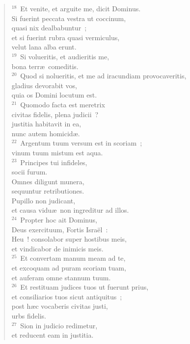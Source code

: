 \begin{verse}${}^{18}$~Et venite, et arguite me, dicit Dominus.\\ Si fuerint peccata vestra ut coccinum,\\ quasi nix dealbabuntur~;\\ et si fuerint rubra quasi vermiculus,\\ velut lana alba erunt.\\
${}^{19}$~Si volueritis, et audieritis me,\\ bona terr\ae\ comeditis.\\
${}^{20}$~Quod si nolueritis, et me ad iracundiam provocaveritis,\\ gladius devorabit vos,\\ quia os Domini locutum est.\\
${}^{21}$~Quomodo facta est meretrix\\ civitas fidelis, plena judicii~?\\ justitia habitavit in ea,\\ nunc autem homicid\ae .\\
${}^{22}$~Argentum tuum versum est in scoriam~;\\ vinum tuum mistum est aqua.\\
${}^{23}$~Principes tui infideles,\\ socii furum.\\ Omnes diligunt munera,\\ sequuntur retributiones.\\ Pupillo non judicant,\\ et causa vidu\ae\ non ingreditur ad illos.\\
${}^{24}$~Propter hoc ait Dominus,\\ Deus exercituum, Fortis Isra\"el~:\\ Heu~! consolabor super hostibus meis,\\ et vindicabor de inimicis meis.\\
${}^{25}$~Et convertam manum meam ad te,\\ et excoquam ad puram scoriam tuam,\\ et auferam omne stannum tuum.\\
${}^{26}$~Et restituam judices tuos ut fuerunt prius,\\ et consiliarios tuos sicut antiquitus~;\\ post h\ae c vocaberis civitas justi,\\ urbs fidelis.\\
${}^{27}$~Sion in judicio redimetur,\\ et reducent eam in justitia.\\

\end{verse}
